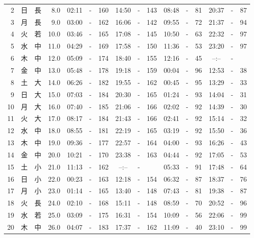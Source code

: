 \documentclass[12pt.a4j]{jsarticle}
\begin{document}
\begin{center}
\begin{table}[ht]
\begin{tabular}{|rc|cr|ccrccr|ccrccr|}
 2 & 日 & 長 &  8.0 &  02:11 &-& 160  &  14:50 &-& 143  &   08:48 &-&  81  &   20:37 &-&  87  \\
 3 & 月 & 長 &  9.0 &  03:00 &-& 162  &  16:06 &-& 142  &   09:55 &-&  72  &   21:37 &-&  94  \\
 4 & 火 & 若 & 10.0 &  03:46 &-& 165  &  17:08 &-& 145  &   10:50 &-&  63  &   22:32 &-&  97  \\
 5 & 水 & 中 & 11.0 &  04:29 &-& 169  &  17:58 &-& 150  &   11:36 &-&  53  &   23:20 &-&  97  \\
 6 & 木 & 中 & 12.0 &  05:09 &-& 174  &  18:40 &-& 155  &   12:16 &-&  45  &   --:-- &-&     \\
 7 & 金 & 中 & 13.0 &  05:48 &-& 178  &  19:18 &-& 159  &   00:04 &-&  96  &   12:53 &-&  38  \\
 8 & 土 & 大 & 14.0 &  06:26 &-& 182  &  19:55 &-& 162  &   00:45 &-&  95  &   13:29 &-&  33  \\
 9 & 日 & 大 & 15.0 &  07:03 &-& 184  &  20:30 &-& 165  &   01:24 &-&  93  &   14:04 &-&  31  \\
10 & 月 & 大 & 16.0 &  07:40 &-& 185  &  21:06 &-& 166  &   02:02 &-&  92  &   14:39 &-&  30  \\
11 & 火 & 大 & 17.0 &  08:17 &-& 184  &  21:43 &-& 166  &   02:41 &-&  92  &   15:14 &-&  32  \\
12 & 水 & 中 & 18.0 &  08:55 &-& 181  &  22:19 &-& 165  &   03:19 &-&  92  &   15:50 &-&  36  \\
13 & 木 & 中 & 19.0 &  09:36 &-& 177  &  22:57 &-& 164  &   04:00 &-&  93  &   16:26 &-&  43  \\
14 & 金 & 中 & 20.0 &  10:21 &-& 170  &  23:38 &-& 163  &   04:44 &-&  92  &   17:05 &-&  53  \\
15 & 土 & 小 & 21.0 &  11:13 &-& 162  &  --:-- &-&     &   05:33 &-&  91  &   17:48 &-&  64  \\
16 & 日 & 小 & 22.0 &  00:23 &-& 163  &  12:18 &-& 154  &   06:32 &-&  87  &   18:37 &-&  76  \\
17 & 月 & 小 & 23.0 &  01:14 &-& 165  &  13:40 &-& 148  &   07:43 &-&  81  &   19:38 &-&  87  \\
18 & 火 & 長 & 24.0 &  02:10 &-& 168  &  15:11 &-& 148  &   08:59 &-&  70  &   20:52 &-&  96  \\
19 & 水 & 若 & 25.0 &  03:09 &-& 175  &  16:31 &-& 154  &   10:09 &-&  56  &   22:06 &-&  99  \\
20 & 木 & 中 & 26.0 &  04:07 &-& 183  &  17:37 &-& 162  &   11:09 &-&  40  &   23:10 &-&  99  \\

\end{tabular}
\end{table}
\end{center}
\end{document}
